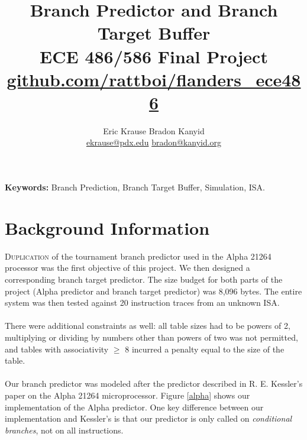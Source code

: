 \documentclass[twocolumn]{article}
\title{\textbf{Branch Predictor and Branch Target Buffer} \\
ECE 486/586 Final Project\\
\vspace{6pt}\large \url{github.com/rattboi/flanders_ece486} }
\author{Eric Krause \hspace{1.4in} Bradon Kanyid\\
\url{ekrause@pdx.edu} \hspace{1in} \url{bradon@kanyid.org}}
\begin{document}
\textbf{Keywords:} Branch Prediction, Branch Target Buffer, Simulation,  ISA.

\section{Background Information}
\lettrine{D}{uplication} of the tournament branch predictor used in the Alpha 21264 processor was the first objective of this project.  We then designed a corresponding branch target predictor.  The size budget for both parts of the project (Alpha predictor and branch target predictor) was 8,096 bytes.  The entire system was then tested against 20 instruction traces from an unknown ISA. \\\\
There were additional constraints as well: all table sizes had to be powers of 2, multiplying or dividing by numbers other than powers of two was not permitted, and tables with associativity $\ge$ 8 incurred a penalty equal to the size of the table.\\\\
Our branch predictor was modeled after the predictor described in R. E. Kessler's paper on the Alpha 21264 microprocessor.  Figure \ref{alpha} shows our implementation of the Alpha predictor.  One key difference between our implementation and Kessler's is that our predictor is only called on \textit{conditional branches}, not on all instructions.
\end{document}
